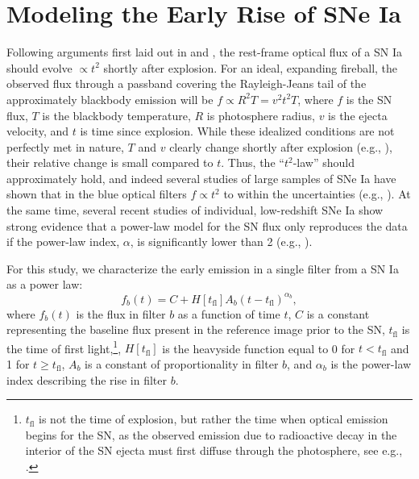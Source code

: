 \documentclass[twocolumn]{./aastex63}
\begin{document}
\section{Modeling the Early Rise of SNe Ia}\label{sec:model}

Following arguments first laid out in \citet{Goldhaber98a} and
\citet{Riess99a}, the rest-frame optical flux of a SN Ia should evolve
$\propto t^2$ shortly after explosion. For an ideal, expanding fireball, the
observed flux through a passband covering the Rayleigh-Jeans tail of the
approximately blackbody emission will be $f \propto R^2 T = v^2 t^2 T$, where
$f$ is the SN flux, $T$ is the blackbody temperature, $R$ is photosphere
radius, $v$ is the ejecta velocity, and $t$ is time since explosion. While
these idealized conditions are not perfectly met in nature, $T$ and $v$
clearly change shortly after explosion (e.g., \citealt{Parrent12}), their
relative change is small compared to $t$. Thus, the ``$t^2$-law'' should
approximately hold, and indeed several studies of large samples of SNe Ia
have shown that in the blue optical filters $f \propto t^2$ to within the
uncertainties (e.g., \citealt{Conley06, Hayden10, Ganeshalingam11}). At the
same time, several recent studies of individual, low-redshift SNe Ia show
strong evidence that a power-law model for the SN flux only reproduces the
data if the power-law index, $\alpha$, is significantly lower than 2 (e.g.,
\citealt{Zheng13,Zheng14,Shappee16,Miller18,Fausnaugh19}).

For this study, we characterize the early emission in a single filter from a
SN Ia as a power law:
%
\begin{equation}
    f_b(t) = C + H[t_\mathrm{fl}] A_b (t - t_\mathrm{fl})^{\alpha_b},
    \label{eqn:flux_model}
\end{equation}
%
where $f_b(t)$ is the flux in filter $b$ as a function of time $t$, $C$ is a
constant representing the baseline flux present in the reference image prior
to the SN, $t_\mathrm{fl}$ is the time of first light,\footnote{$t_\mathrm{fl}$ is not the time of
explosion, but rather the time when optical emission begins for the SN, as
the observed emission due to radioactive decay in the interior of the SN
ejecta must first diffuse through the photosphere, see e.g.,
\citet{Piro13,Piro14}.}, $H[t_\mathrm{fl}]$ is the heavyside function equal
to 0 for $t < t_\mathrm{fl}$ and 1 for $t \ge t_\mathrm{fl}$, $A_b$ is a
constant of proportionality in filter $b$, and $\alpha_b$ is the power-law
index describing the rise in filter $b$.
\end{document}

